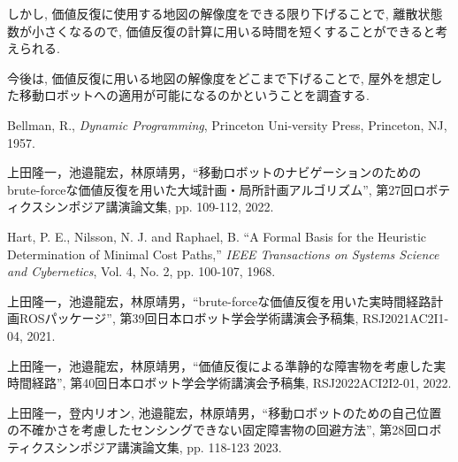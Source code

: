 \documentclass{jarticle}
\begin{document}
しかし, 価値反復に使用する地図の解像度をできる限り下げることで, 
離散状態数が小さくなるので, 価値反復の計算に用いる時間を短くすることができると考えられる.

今後は, 価値反復に用いる地図の解像度をどこまで下げることで, 
屋外を想定した移動ロボットへの適用が可能になるのかということを調査する. 

\footnotesize
\begin{thebibliography}{99}

	Bellman, R., {\it Dynamic Programming}, Princeton Uni-versity Press, Princeton, NJ, 1957.

	上田隆一，池邉龍宏，林原靖男，``移動ロボットのナビゲーションのためのbrute-forceな価値反復を用いた大域計画・局所計画アルゴリズム'', 
	第27回ロボティクスシンポジア講演論文集, pp. 109-112, 2022.
	
	Hart, P. E., Nilsson, N. J. and Raphael, B. ``A Formal
	Basis for the Heuristic Determination of Minimal Cost
	Paths,'' {\it IEEE Transactions on Systems Science and Cybernetics}, Vol. 4, No. 2, pp. 100-107, 1968.
	
	上田隆一，池邉龍宏，林原靖男，``brute-forceな価値反復を用いた実時間経路計画ROSパッケージ'', 
	第39回日本ロボット学会学術講演会予稿集, RSJ2021AC2I1-04, 2021.

	上田隆一，池邉龍宏，林原靖男，``価値反復による準静的な障害物を考慮した実時間経路'', 
	第40回日本ロボット学会学術講演会予稿集, RSJ2022ACI2I2-01, 2022.

	上田隆一，登内リオン, 池邉龍宏，林原靖男，``移動ロボットのための自己位置の不確かさを考慮したセンシングできない固定障害物の回避方法'', 
	第28回ロボティクスシンポジア講演論文集, pp. 118-123 2023.

\end{thebibliography}

\normalsize
\end{document}
